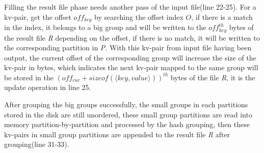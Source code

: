 Filling the result file phase needs another pass of the input file(line 22-25). For a kv-pair, get the offset ${off}_{key}$ by searching the offset index $O$, if there is a match in the index, it belongs to a big group and will be written to the ${off}^{th}_{key}$ bytes of the result file \emph{R} depending on the offset, if there is no match, it will be written to the corresponding partition in \emph{P}. With this kv-pair from input file having been output, the current offset of the corresponding group will increase the size of the kv-pair in bytes, which indicates the next kv-pair mapped to the same group will be stored in the ${({off}_{cur} + sizeof(\langle key,value\rangle ))}^{th}$ bytes of the file \emph{R}, it is the update operation in line 25.

After grouping the big groups successfully, the small groups in each partitions stored in the disk are still unordered, these small group partitions are read into memory partition-by-partition and processed by the hash grouping, then these kv-pairs in small group partitions are appended to the result file \emph{R} after grouping(line 31-33).







